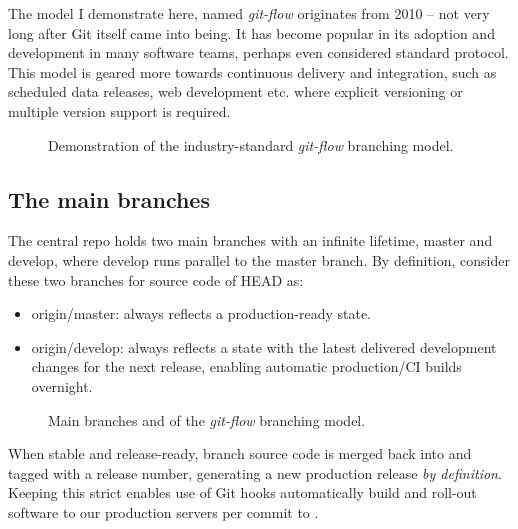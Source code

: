 The model I demonstrate here, named \emph{git-flow} originates from 2010 -- not very long after Git itself came into being. It has become popular in its adoption and development in many software teams, perhaps even considered standard protocol. This model is geared more towards continuous delivery and integration, such as scheduled data releases, web development etc. where explicit versioning or multiple version support is required.

\vspace{11\baselineskip}%
\begin{figure}[H]
	\centering
	\noindent\resizebox{\textwidth}{!}{}
	\caption[A successful Git branching model]{Demonstration of the industry-standard \emph{git-flow} branching model.}
\end{figure}



\subsection{The main branches}

The central repo holds two main branches with an infinite lifetime, master and develop, where develop runs parallel to the master branch. By definition, consider these two branches for source code of HEAD as:

\begin{itemize}
	\item origin/master: always reflects a production-ready state.
	\item origin/develop: always reflects a state with the latest delivered development changes for the next release, enabling automatic production/CI builds overnight.
\end{itemize}

\vspace{6\baselineskip}%
\begin{figure}[H]
	\centering
	\noindent\resizebox{.66\textwidth}{!}{}
	\caption[Main branches]{Main branches  and  of the \emph{git-flow} branching model.}
\end{figure}

When stable and release-ready,  branch source code is merged back into  and tagged with a release number, generating a new production release \emph{by definition}. Keeping this strict enables use of Git hooks automatically build and roll-out software to our production servers per commit to .



